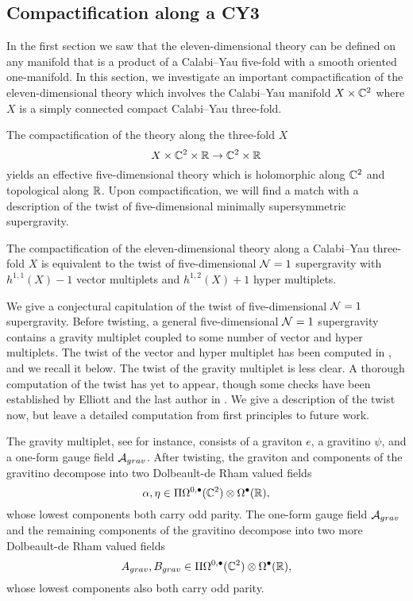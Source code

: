 \subsection{Compactification along a CY3}\label{s:CY3}

In the first section we saw that the eleven-dimensional theory can be defined on any manifold that is a product of a Calabi--Yau five-fold with a smooth oriented one-manifold. 
In this section, we investigate an important compactification of the eleven-dimensional theory which involves the Calabi--Yau manifold $X \times \mathbb C^2$ where $X$ is a simply connected compact Calabi--Yau three-fold.

The compactification of the theory along the three-fold $X$ 
\[
X \times \mathbb C^2 \times \mathbb R \to \mathbb C^2 \times \mathbb R
\]
yields an effective five-dimensional theory which is holomorphic along $\mathbb C^2$ and topological along $\mathbb R$. 
Upon compactification, we will find a match with a description of the twist of five-dimensional minimally supersymmetric supergravity. 

\begin{prop}
\label{prop:5dsugra}
The compactification of the eleven-dimensional theory along a Calabi--Yau three-fold $X$ is equivalent to the twist of five-dimensional $\mathcal N=1$ supergravity with $h^{1,1}(X)-1$ vector multiplets and $h^{1,2}(X) + 1$ hyper multiplets. 
\end{prop}

\parsec[s:5dsugra]

We give a conjectural capitulation of the twist of five-dimensional $\mathcal N=1$ supergravity. 
Before twisting, a general five-dimensional $\mathcal N=1$ supergravity contains a gravity multiplet coupled to some number of vector and hyper multiplets. 
The twist of the vector and hyper multiplet has been computed in \cite{ESW}, and we recall it below. 
The twist of the gravity multiplet is less clear. 
A thorough computation of the twist has yet to appear, though some checks have been established by Elliott and the last author in \cite{EWpoisson}. 
We give a description of the twist now, but leave a detailed computation from first principles to future work. 

The gravity multiplet, see \cite{CCDF} for instance, consists of a graviton $e$, a gravitino $\psi$, and a one-form gauge field $\mathcal A_{grav}$.
After twisting, the graviton and components of the gravitino decompose into two Dolbeault-de Rham valued fields 
\[
\alpha, \eta \in \Pi \Omega^{0,\bullet}(\mathbb C^2) \otimes \Omega^\bullet(\mathbb R) ,
\]
whose lowest components both carry odd parity. 
The one-form gauge field $\mathcal A_{grav}$ and the remaining components of the gravitino decompose into two more Dolbeault-de Rham valued fields
\[
A_{grav} , B_{grav} \in \Pi \Omega^{0,\bullet}(\mathbb C^2) \otimes \Omega^\bullet(\mathbb R) ,
\]
whose lowest components also both carry odd parity. 

